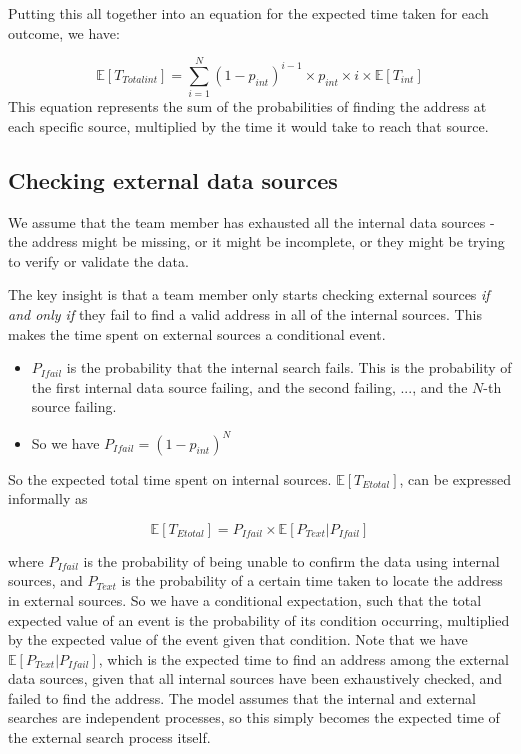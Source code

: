 \documentclass{article}
\begin{document}
Putting this all together into an equation for the expected time taken for each outcome, we have:

\begin{equation}
   \mathbb{E}\left[T_{Totalint}\right] = \sum_{i=1}^{N} \left(1 - p_{int} \right)^{i-1} \times p_{int} \times i \times \mathbb{E}\left[ T_{int}\right]
\end{equation}
This equation represents the sum of the probabilities of finding the address at each specific source, multiplied by the time it would take to reach that source.

\subsection{Checking external data sources}

We assume that the team member has exhausted all the internal data sources - the address might be missing, or it might be incomplete, or they might be trying to verify or validate the data.

The key insight is that a team member only starts checking external sources \emph{if and only if} they fail to find a valid address in all of the internal sources. This makes the time spent on external sources a conditional event.

\begin{itemize}
    \item $P_{Ifail}$ is the probability that the internal search fails. This is the probability of the first internal data source failing, and the second failing, ..., and the $N$-th source failing.
    \item So we have $P_{Ifail} = \left(1 - p_{int}\right)^{N}$
\end{itemize}
So the expected total time spent on internal sources. $\mathbb{E}[T_{Etotal}]$, can be expressed informally as 

\begin{equation}
  \mathbb{E}[T_{Etotal}] = P_{Ifail} \times \mathbb{E}[P_{Text} | P_{Ifail}] 
\end{equation}


where $P_{Ifail}$ is the probability of being unable to confirm the data using internal sources, and $P_{Text}$ is the probability of a certain time taken to locate the address in external sources. So we have a conditional expectation, such that the total expected value of an event is the probability of its condition occurring, multiplied by the expected value of the event given that condition. Note that we have $\mathbb{E}[P_{Text} | P_{Ifail}]$, which is the expected time to find an address among the external data sources, given that all internal sources have been exhaustively checked, and failed to find the address. The model assumes that the internal and external searches are independent processes, so this simply becomes the expected time of the external search process itself.
\end{document}
